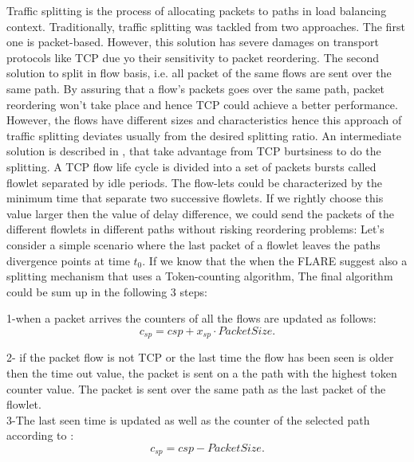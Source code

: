 Traffic splitting is the process of allocating packets to paths in load balancing context. Traditionally, traffic splitting was tackled from two approaches. The first one is packet-based. However, this solution has severe damages on transport protocols like TCP due yo their sensitivity to packet reordering. The second solution to split in flow basis, i.e. all packet of the same flows are sent over the same path. By assuring that a flow's packets goes over the same path, packet reordering won't take place and hence TCP could achieve a better performance. However, the flows have different sizes and characteristics hence this approach of traffic splitting deviates usually from the desired splitting ratio. An intermediate solution is described in \cite {sin1}, that take advantage from TCP burtsiness to do the splitting. A TCP flow life cycle is divided into a set of packets bursts called flowlet separated by idle periods. The flow-lets could be characterized by the minimum time that separate two successive flowlets. If we rightly choose this value larger then the value of delay difference, we could send the packets of the different flowlets in different paths without risking reordering problems: Let's consider a simple scenario where the last packet of a flowlet leaves the paths divergence points at time $t_0$. If we know that the when the 
FLARE suggest also a splitting mechanism that uses a Token-counting algorithm, 
The final algorithm could be sum up in the following 3 steps:

1-when a packet arrives the counters of all the flows are updated as follows:
\begin{equation}
c_{sp} = c{sp} + x_{sp} \cdot PacketSize.
\end{equation}

2- if the packet flow is not TCP or the last time the flow has been seen is older then the time out value, the packet is sent on a the path with the highest token counter value. The packet is sent over the same path as the last packet of the flowlet.\\

3-The last seen time is updated as well as the counter of the selected path according to :
\begin{equation}
c_{sp} = c{sp} - PacketSize.
\end{equation}

